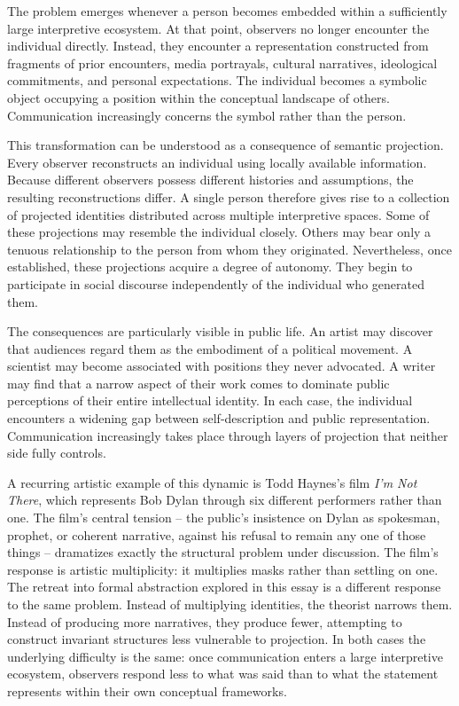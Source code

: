 \documentclass[11pt]{article}
\theoremstyle{plain}
\begin{document}
The problem emerges whenever a person becomes embedded within a sufficiently large interpretive ecosystem. At that point, observers no longer encounter the individual directly. Instead, they encounter a representation constructed from fragments of prior encounters, media portrayals, cultural narratives, ideological commitments, and personal expectations. The individual becomes a symbolic object occupying a position within the conceptual landscape of others. Communication increasingly concerns the symbol rather than the person.

This transformation can be understood as a consequence of semantic projection. Every observer reconstructs an individual using locally available information. Because different observers possess different histories and assumptions, the resulting reconstructions differ. A single person therefore gives rise to a collection of projected identities distributed across multiple interpretive spaces. Some of these projections may resemble the individual closely. Others may bear only a tenuous relationship to the person from whom they originated. Nevertheless, once established, these projections acquire a degree of autonomy. They begin to participate in social discourse independently of the individual who generated them.

The consequences are particularly visible in public life. An artist may discover that audiences regard them as the embodiment of a political movement. A scientist may become associated with positions they never advocated. A writer may find that a narrow aspect of their work comes to dominate public perceptions of their entire intellectual identity. In each case, the individual encounters a widening gap between self-description and public representation. Communication increasingly takes place through layers of projection that neither side fully controls.

A recurring artistic example of this dynamic is Todd Haynes's film \emph{I'm Not There}, which represents Bob Dylan through six different performers rather than one. The film's central tension -- the public's insistence on Dylan as spokesman, prophet, or coherent narrative, against his refusal to remain any one of those things -- dramatizes exactly the structural problem under discussion. The film's response is artistic multiplicity: it multiplies masks rather than settling on one. The retreat into formal abstraction explored in this essay is a different response to the same problem. Instead of multiplying identities, the theorist narrows them. Instead of producing more narratives, they produce fewer, attempting to construct invariant structures less vulnerable to projection. In both cases the underlying difficulty is the same: once communication enters a large interpretive ecosystem, observers respond less to what was said than to what the statement represents within their own conceptual frameworks.
\end{document}
